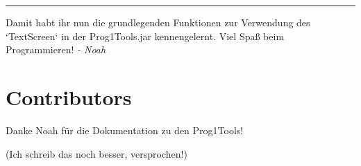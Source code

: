 \documentclass[12pt,a4paper]{article}
\begin{document}
\bigskip
\hrule
\bigskip

Damit habt ihr nun die grundlegenden Funktionen zur Verwendung des `TextScreen` in der Prog1Tools.jar kennengelernt. Viel Spaß beim Programmieren! \textit{- Noah}

\newpage
{}
\setcounter{section}{0}
\renewcommand{\thesection}{\arabic{section}}

\section{Contributors}
Danke Noah für die Dokumentation zu den Prog1Tools!

(Ich schreib das noch besser, versprochen!)
\end{document}
